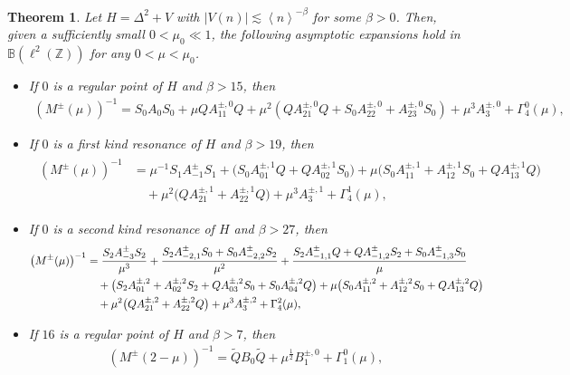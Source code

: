 \documentclass[10pt,a4paper]{amsart}
\newtheorem{theorem}[definition]{Theorem}
\newcommand\Z{\mathbb{Z}}
\newcommand\B{\mathbb{B}}
\numberwithin{equation}{section}
\begin{document}
\setcounter{section}{1}
\setcounter{equation}{19}
\setcounter{definition}{7}
\begin{theorem}\label{Asymptotic expansion theorem}
Let $H=\Delta^2+V$ with $|V(n)|\lesssim \left<n\right>^{-\beta}$ for some $\beta>0$. 
Then, given a sufficiently small $0<\mu_0\ll1$, the following asymptotic expansions hold in $\B(\ell^2(\Z))$ for any $0<\mu<\mu_0$.
\begin{itemize}
\item[{\rm(i)}] If $0$ is a regular point of $H$ and $\beta>15$, then
\begin{align}\label{asy expan of regular 0}
\left(M^{\pm}(\mu)\right)^{-1}=S_0A_{0}S_0+\mu QA^{\pm,0}_{11}Q+\mu^2(QA^{\pm,0}_{21}Q+S_0A^{\pm,0}_{22}+A^{\pm,0}_{23}S_0)+\mu^3A^{\pm,0}_3+\Gamma^{0}_{4}(\mu),
\end{align}
\item [{\rm(ii)}] If $0$ is a first kind resonance of $H$ and $\beta>19$, then
\begin{align}\label{asy expan of 1st 0}
\begin{split}
\left(M^{\pm}(\mu)\right)^{-1}&=\mu^{-1}S_{1}A^{\pm}_{-1}S_{1}+\big(S_0A^{\pm,1}_{01}Q+QA^{\pm,1}_{02}S_0\big)+\mu\big(S_0A^{\pm,1}_{11}+A^{\pm,1}_{12}S_0+QA^{\pm,1}_{13}Q\big)\\
&\quad+\mu^2\big(QA^{\pm,1}_{21}+A^{\pm,1}_{22}Q\big)+\mu^3A^{\pm,1}_{3}+\Gamma^{1}_{4}(\mu),
\end{split}
\end{align}
\item [{\rm(iii)}] If $0$ is a second kind resonance of $H$ and $\beta>27$, then
\begin{align}\label{asy expan 2nd 0}
\left(M^{\pm}(\mu)\right)^{-1}&=\frac{S_{2}A^{\pm}_{-3}S_{2}}{\mu^3}+\frac{S_2A^{\pm}_{-2,1}S_0+S_0A^{\pm}_{-2,2}S_2}{\mu^2}
+\frac{S_2A^{\pm}_{-1,1}Q+QA^{\pm}_{-1,2}S_2+S_0A^{\pm}_{-1,3}S_0}{\mu}\notag\\
 &\quad+\big(S_2A^{\pm,2}_{01}+A^{\pm,2}_{02}S_2+QA^{\pm,2}_{03}S_0+S_0A^{\pm,2}_{04}Q\big)+\mu\big(S_0A^{\pm,2}_{11}+A^{\pm,2}_{12}S_0+QA^{\pm,2}_{13}Q\big)\notag\\
&\quad+\mu^2\big(QA^{\pm,2}_{21}+A^{\pm,2}_{22}Q\big)+\mu^3A^{\pm,2}_{3}+\Gamma^{2}_{4}(\mu),
\end{align}
\item[{\rm(iv)}] If $16$ is a regular point of $H$ and $\beta>7$, then
\begin{align}\label{asy expan regular 2}
\left(M^{\pm}(2-\mu)\right)^{-1}=\widetilde{Q}B_{0}\widetilde{Q}+
\mu^{\frac{1}{2}}B^{\pm,0}_1 +\Gamma^{0}_{1}(\mu),

\end{align}
\end{itemize}
\end{theorem}
\end{document}
